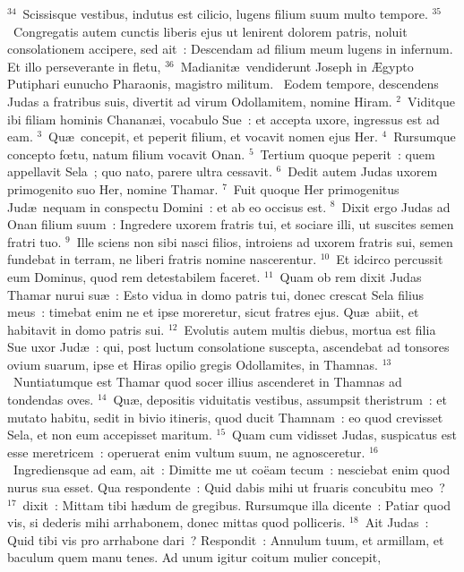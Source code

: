 ${}^{34}$~Scissisque vestibus, indutus est cilicio, lugens filium suum multo tempore.
${}^{35}$~Congregatis autem cunctis liberis ejus ut lenirent dolorem patris, noluit consolationem accipere, sed ait~: Descendam ad filium meum lugens in infernum. Et illo perseverante in fletu,
${}^{36}$~Madianit\ae\ vendiderunt Joseph in \AE gypto Putiphari eunucho Pharaonis, magistro militum.
~Eodem tempore, descendens Judas a fratribus suis, divertit ad virum Odollamitem, nomine Hiram.
${}^{2}$~Viditque ibi filiam hominis Chanan\ae i, vocabulo Sue~: et accepta uxore, ingressus est ad eam.
${}^{3}$~Qu\ae\ concepit, et peperit filium, et vocavit nomen ejus Her.
${}^{4}$~Rursumque concepto fœtu, natum filium vocavit Onan.
${}^{5}$~Tertium quoque peperit~: quem appellavit Sela~; quo nato, parere ultra cessavit.
${}^{6}$~Dedit autem Judas uxorem primogenito suo Her, nomine Thamar.
${}^{7}$~Fuit quoque Her primogenitus Jud\ae\ nequam in conspectu Domini~: et ab eo occisus est.
${}^{8}$~Dixit ergo Judas ad Onan filium suum~: Ingredere uxorem fratris tui, et sociare illi, ut suscites semen fratri tuo.
${}^{9}$~Ille sciens non sibi nasci filios, introiens ad uxorem fratris sui, semen fundebat in terram, ne liberi fratris nomine nascerentur.
${}^{10}$~Et idcirco percussit eum Dominus, quod rem detestabilem faceret.
${}^{11}$~Quam ob rem dixit Judas Thamar nurui su\ae~: Esto vidua in domo patris tui, donec crescat Sela filius meus~: timebat enim ne et ipse moreretur, sicut fratres ejus. Qu\ae\ abiit, et habitavit in domo patris sui.
${}^{12}$~Evolutis autem multis diebus, mortua est filia Sue uxor Jud\ae~: qui, post luctum consolatione suscepta, ascendebat ad tonsores ovium suarum, ipse et Hiras opilio gregis Odollamites, in Thamnas.
${}^{13}$~Nuntiatumque est Thamar quod socer illius ascenderet in Thamnas ad tondendas oves.
${}^{14}$~Qu\ae , depositis viduitatis vestibus, assumpsit theristrum~: et mutato habitu, sedit in bivio itineris, quod ducit Thamnam~: eo quod crevisset Sela, et non eum accepisset maritum.
${}^{15}$~Quam cum vidisset Judas, suspicatus est esse meretricem~: operuerat enim vultum suum, ne agnosceretur.
${}^{16}$~Ingrediensque ad eam, ait~: Dimitte me ut co\"eam tecum~: nesciebat enim quod nurus sua esset. Qua respondente~: Quid dabis mihi ut fruaris concubitu meo~?
${}^{17}$~dixit~: Mittam tibi h\ae dum de gregibus. Rursumque illa dicente~: Patiar quod vis, si dederis mihi arrhabonem, donec mittas quod polliceris.
${}^{18}$~Ait Judas~: Quid tibi vis pro arrhabone dari~? Respondit~: Annulum tuum, et armillam, et baculum quem manu tenes. Ad unum igitur coitum mulier concepit,
